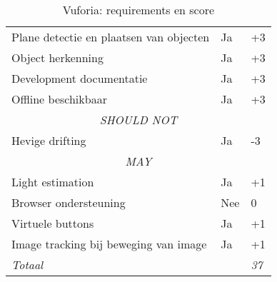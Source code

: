 \begin{table}[]
\begin{tabular}{@{}lll@{}}
        Plane detectie en plaatsen van objecten    & Ja                                            & +3             \\
        Object herkenning                          & Ja                                            & +3             \\
        Development documentatie                   & Ja                                            & +3             \\
        Offline beschikbaar                        & Ja                                            & +3             \\ \midrule
        \multicolumn{3}{c}{\textit{SHOULD NOT}}                                                                     \\ \midrule
        Hevige drifting                            & Ja                                            & -3             \\ \midrule
        \multicolumn{3}{c}{\textit{MAY}}                                                                            \\ \midrule
        Light estimation                           & Ja                                            & +1             \\
        Browser ondersteuning                      & Nee                                           & 0              \\
        Virtuele buttons                           & Ja                                            & +1             \\
        Image tracking bij beweging van image      & Ja                                            & +1             \\ \midrule
        \textit{Totaal}                            & \multicolumn{1}{r}{}                          & \textit{37}    \\ \bottomrule
    \end{tabular}
    \caption{Vuforia: requirements en score}
    \label{tbl:vuforiareq}
\end{table}

